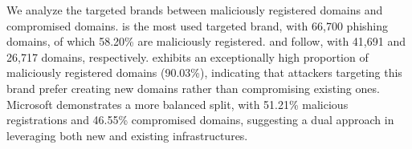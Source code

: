 We analyze the targeted brands between maliciously registered domains and compromised domains.
 is the most used targeted brand, with 66,700 phishing domains, of which 58.20\% are maliciously registered. 
 and  follow, with 41,691 and 26,717 domains, respectively. 
 exhibits an exceptionally high proportion of maliciously registered domains (90.03\%), indicating that attackers targeting this brand prefer creating new domains rather than compromising existing ones. 
Microsoft demonstrates a more balanced split, with 51.21\% malicious registrations and 46.55\% compromised domains, suggesting a dual approach in leveraging both new and existing infrastructures.





